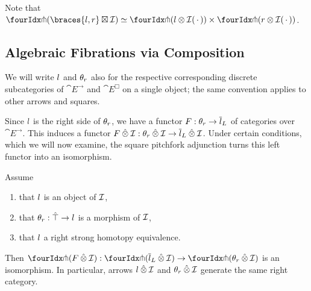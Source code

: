 \documentclass[reqno,10pt,a4paper,oneside]{amsart}
\begin{document}
Note that $\liftr{(\braces{\intervall, \intervalr} \boxtimes \cal{I})} \simeq \liftr{(l \otimes \cal{I}\brarghole)} \times \liftr{(r \otimes \cal{I}\brarghole)}$.

\subsection{Algebraic Fibrations via Composition}

We will write $\intervall$ and $\thetar$ also for the respective corresponding discrete subcategories of $\cat{E}^{\to}$ and $\cat{E}^{\Box}$ on a single object; the same convention applies to other arrows and squares.

Since $\intervall$ is the right side of $\thetar$, we have a functor $F : \thetar \to \overline{\intervall}_L$ of categories over $\cat{E}^{\to}$.
This induces a functor $F \hatotimes \cal{I} : \thetar \hatotimes \cal{I} \to \overline{\intervall}_L \hatotimes \cal{I}$.
Under certain conditions, which we will now examine, the square pitchfork adjunction turns this left functor into an isomorphism.

\begin{lemma}
\label{filling-vs-composition}
Assume
\begin{enumerate}
\item
that $\intervall$ is an object of $\cal{I}$,
\item
that $\thetar : \hatunit \to \intervall$ is a morphism of $\cal{I}$,
\item
that $\intervall$ a right strong homotopy equivalence.
\end{enumerate}
Then $\liftr{(F \hatotimes \cal{I})} : \liftr{(\overline{\intervall}_L \hatotimes \cal{I})} \to \liftr{(\thetar \hatotimes \cal{I})}$ is an isomorphism.
In particular, arrows $\intervall \hatotimes \cal{I}$ and $\thetar \hatotimes \cal{I}$ generate the same right category.
\end{lemma}
\end{document}
